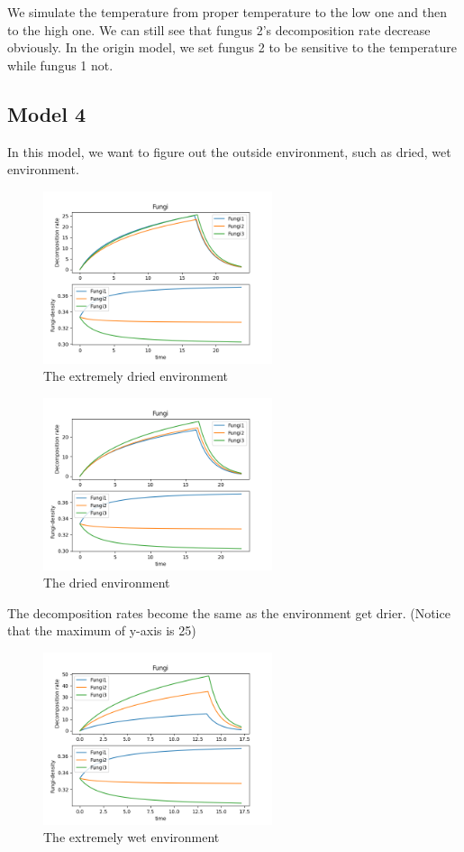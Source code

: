 \documentclass{mcmthesis}
\begin{document}
We simulate the temperature from proper temperature to the low one and then to the high one.
We can still see that fungus 2's decomposition rate decrease obviously.
In the origin model, we set fungus 2 to be sensitive to the temperature while fungus 1 not.

\newpage
\subsection{Model 4}
In this model, we want to figure out the outside environment, such as dried, wet environment.
\begin{figure}[H]
  \centering
  \includegraphics[width=0.6\textwidth]{figures/Model 4.png}
  \caption{The extremely dried environment}
\end{figure}

\begin{figure}[H]
  \centering
  \includegraphics[width=0.6\textwidth]{figures/Model 5.png}
  \caption{The dried environment}
\end{figure}
The decomposition rates become the same as the environment get drier.
(Notice that the maximum of y-axis is 25)

\begin{figure}[H]
  \centering
  \includegraphics[width=0.6\textwidth]{figures/Model 6.png}
  \caption{The extremely wet environment}
\end{figure}
\end{document}
